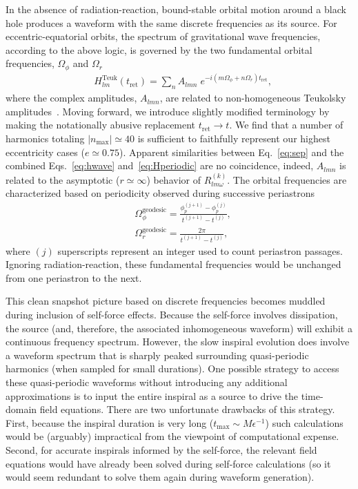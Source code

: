 \documentclass[aps,prd,twocolumn,showpacs,notitlepage,eqsecnum,
superscriptaddress,nofootinbib]{revtex4-1}
\begin{document}
In the absence of radiation-reaction, bound-stable orbital motion around a black hole produces a waveform with the same discrete frequencies as its source. For eccentric-equatorial orbits, the spectrum of gravitational wave frequencies, according to the above logic, is governed by the two fundamental orbital frequencies, $\Omega_\phi$ and $\Omega_r$
\begin{align}
\label{eq:Hperiodic}
& H^\text{Teuk}_{lm}(t_\text{ret}) = \sum_n A_{lmn} \; e^{-i(m\Omega_\phi + n \Omega_r)t_\text{ret}} ,
\end{align}
where the complex amplitudes, $A_{lmn}$, are related to non-homogeneous Teukolsky amplitudes~\cite{WarbOsbu17}.  Moving forward, we introduce slightly modified terminology by making the notationally abusive replacement $t_\text{ret} \rightarrow t$. We find that a number of harmonics totaling $|n_\text{max}| \simeq 40$ is sufficient to faithfully represent our highest eccentricity cases ($e\simeq0.75$). Apparent similarities between Eq.~\eqref{eq:sep} and the combined Eqs.~\eqref{eq:hwave} and~\eqref{eq:Hperiodic} are no coincidence, indeed, $A_{lmn}$ is related to the asymptotic ($r\simeq \infty$) behavior of $R_{lm\omega}^{(k)}$. The orbital frequencies are characterized based on periodicity observed during successive periastrons
\begin{align}
\label{eq:Omega_phi}
&\Omega_\phi^\text{geodesic} = \frac{\phi^{(j+1)}_p-\phi^{(j)}_p}{t^{(j+1)}-t^{(j)}} ,
\\
\label{eq:Omega_r}
&\Omega_r^\text{geodesic} = \frac{2\pi}{t^{(j+1)}-t^{(j)}} ,
\end{align}
where $(j)$ superscripts represent an integer used to count periastron passages. Ignoring radiation-reaction, these fundamental frequencies would be unchanged from one periastron to the next.

This clean snapshot picture based on discrete frequencies becomes muddled during inclusion of self-force effects. Because the self-force involves dissipation, the source (and, therefore, the associated inhomogeneous waveform) will exhibit a continuous frequency spectrum. However, the slow inspiral evolution does involve a waveform spectrum that is sharply peaked surrounding quasi-periodic harmonics (when sampled for small durations). One possible strategy to access these quasi-periodic waveforms without introducing any additional approximations is to input the entire inspiral as a source to drive the time-domain field equations. There are two unfortunate drawbacks of this strategy. First, because the inspiral duration is very long ($t_\text{max} \sim M \epsilon^{-1}$) such calculations would be (arguably) impractical from the viewpoint of computational expense. Second, for accurate inspirals informed by the self-force, the relevant field equations would have already been solved during self-force calculations (so it would seem redundant to solve them again during waveform generation).
\end{document}
